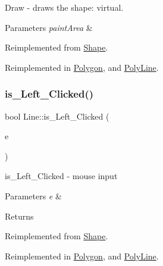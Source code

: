 Draw -\/ draws the shape\+: virtual. 


\begin{DoxyParams}{Parameters}
{\em paint\+Area} & \\
\hline
\end{DoxyParams}


Reimplemented from \hyperlink{class_shape_ad7cc6a5e97b0971d50999bce4396127a}{Shape}.



Reimplemented in \hyperlink{class_polygon_a9271921d96331c203efcdb50e0ebd64c}{Polygon}, and \hyperlink{class_poly_line_ac42ca364849f33b899a929bf57163730}{Poly\+Line}.

\mbox{\label{class_line_a79c3891fefd740e6a3cfcdb57a105995}} 
\subsubsection{\texorpdfstring{is\+\_\+\+Left\+\_\+\+Clicked()}{is\_Left\_Clicked()}}
{\footnotesize\ttfamily bool Line\+::is\+\_\+\+Left\+\_\+\+Clicked (\begin{DoxyParamCaption}\item[{Q\+Point}]{e }\end{DoxyParamCaption})\hspace{0.3cm}{\ttfamily [virtual]}}



is\+\_\+\+Left\+\_\+\+Clicked -\/ mouse input 


\begin{DoxyParams}{Parameters}
{\em e} & \\
\hline
\end{DoxyParams}
\begin{DoxyReturn}{Returns}

\end{DoxyReturn}


Reimplemented from \hyperlink{class_shape_ab2d47c913eb287843e61b2d48e422ced}{Shape}.



Reimplemented in \hyperlink{class_polygon_ab17f2f8ae9489fba4030fbb4a99e7ea6}{Polygon}, and \hyperlink{class_poly_line_a349f5b14d3ab568ae6776a3d5fd6f956}{Poly\+Line}.

\mbox{\label{class_line_a01ac38eae66f157868daee1b4764b242}} 
